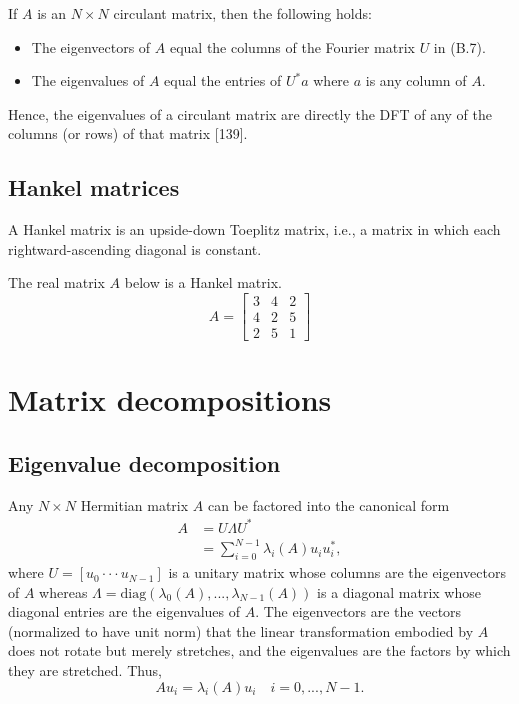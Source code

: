 \documentclass[a4paper, 12pt]{book}
\begin{document}
If $A$ is an $N \times N$ circulant matrix, then the following holds:
\begin{itemize}
    \item The eigenvectors of $A$ equal the columns of the Fourier matrix $U$ in (B.7).
    \item The eigenvalues of $A$ equal the entries of $U^{*}a$ where $a$ is any column of $A$.
\end{itemize}
Hence, the eigenvalues of a circulant matrix are directly the DFT of any of the columns (or rows) of that matrix [139].

\subsection{Hankel matrices}
A Hankel matrix is an upside-down Toeplitz matrix, i.e., a matrix in which each rightward-ascending diagonal is constant.

\begin{greenbox}[Example B.5]
The real matrix $A$ below is a Hankel matrix.
\begin{equation}
    A = \begin{bmatrix} 3 & 4 & 2 \\ 4 & 2 & 5 \\ 2 & 5 & 1 \end{bmatrix}
\end{equation}
\end{greenbox}

\section{Matrix decompositions}

\subsection{Eigenvalue decomposition}
Any $N \times N$ Hermitian matrix $A$ can be factored into the canonical form
\begin{align}
    A &= U\Lambda U^{*} \tag{B.11} \\
      &= \sum_{i=0}^{N-1}\lambda_{i}(A)u_{i}u_{i}^{*}, \tag{B.12}
\end{align}
where $U=[u_{0}\cdot\cdot\cdot u_{N-1}]$ is a unitary matrix whose columns are the eigenvectors of $A$ whereas $\Lambda=\text{diag}(\lambda_{0}(A),...,\lambda_{N-1}(A))$ is a diagonal matrix whose diagonal entries are the eigenvalues of $A$. The eigenvectors are the vectors (normalized to have unit norm) that the linear transformation embodied by $A$ does not rotate but merely stretches, and the eigenvalues are the factors by which they are stretched. Thus,
\begin{equation}
    A u_{i}=\lambda_{i}(A)u_{i} \quad i=0,...,N-1. \tag{B.14}
\end{equation}
\end{document}
